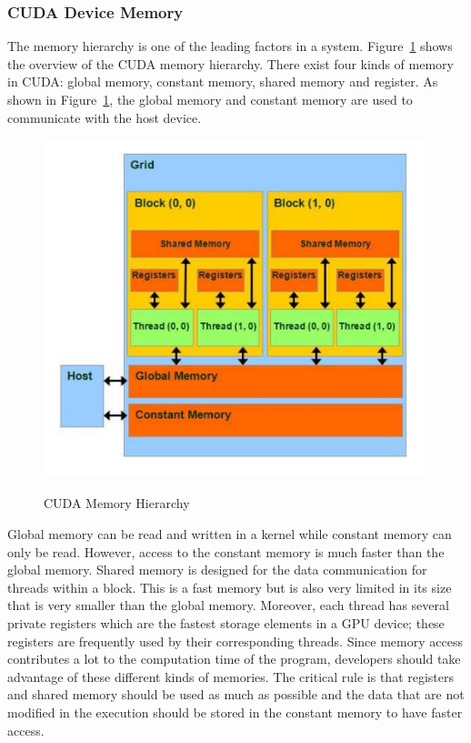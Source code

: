 \documentclass[Ingles]{ic-tese-v1}
\newcommand{\rfig}[1]{Figure~\ref{fig:#1}}
\begin{document}
\newpage
\subsubsection{CUDA Device Memory}
\label{CUDA Device Memory}
The memory hierarchy is one of the leading factors in a system. \rfig{cudamemory} shows the overview of the CUDA memory hierarchy. There exist
four kinds of memory in CUDA: global memory, constant memory, shared memory and register. As shown in \rfig{cudamemory}, the global memory and constant memory are used to communicate with the host device.\\

\begin{figure}[t]
	\caption{CUDA Memory Hierarchy}
	\centering
	\includegraphics[scale=0.70]{images/cuda_memory.png}
	\label{fig:cudamemory}
\end{figure}

Global memory can be read and written in a kernel while constant memory can only be
read. However, access to the constant memory is much faster than the global memory. Shared memory is designed for the data communication for
threads within a block. This is a fast memory but is also very limited in its size that is very smaller than the global memory. Moreover, each thread has several private registers which are the fastest storage elements in a GPU device; these registers are frequently used by their corresponding threads. Since memory access contributes a lot to the computation time of the program, developers should take advantage of these different kinds of memories. The critical rule is that registers and shared memory should be used as much as possible and the data that are not modified in the execution should be stored in the constant memory to have faster access.
\end{document}
